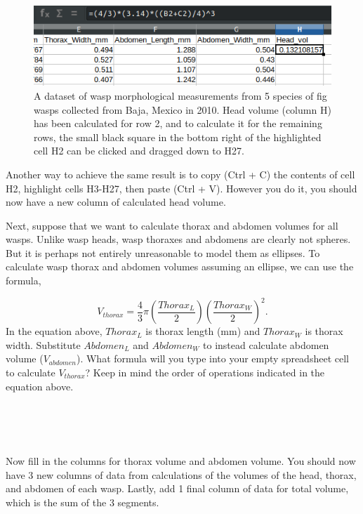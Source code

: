 \documentclass[
]{scrbook}
\begin{document}
\begin{figure}
\includegraphics[width=1\linewidth]{img/Ch1_Ex3_copy_formula} \caption{A dataset of wasp morphological measurements from 5 species of fig wasps collected from Baja, Mexico in 2010. Head volume (column H) has been calculated for row 2, and to calculate it for the remaining rows, the small black square in the bottom right of the highlighted cell H2 can be clicked and dragged down to H27.}\label{fig:unnamed-chunk-20}
\end{figure}

Another way to achieve the same result is to copy (Ctrl + C) the contents of cell H2, highlight cells H3-H27, then paste (Ctrl + V).
However you do it, you should now have a new column of calculated head volume.

Next, suppose that we want to calculate thorax and abdomen volumes for all wasps.
Unlike wasp heads, wasp thoraxes and abdomens are clearly not spheres.
But it is perhaps not entirely unreasonable to model them as ellipses.
To calculate wasp thorax and abdomen volumes assuming an ellipse, we can use the formula,

\[V_{thorax} = \frac{4}{3}\pi \left(\frac{Thorax_{L}}{2}\right)\left(\frac{Thorax_{W}}{2}\right)^{2}.\]
In the equation above, \(Thorax_{L}\) is thorax length (mm) and \(Thorax_{W}\) is thorax width.
Substitute \(Abdomen_{L}\) and \(Abdomen_{W}\) to instead calculate abdomen volume (\(V_{abdomen}\)).
What formula will you type into your empty spreadsheet cell to calculate \(V_{thorax}\)? Keep in mind the order of operations indicated in the equation above.

\begin{verbatim}




\end{verbatim}

Now fill in the columns for thorax volume and abdomen volume.
You should now have 3 new columns of data from calculations of the volumes of the head, thorax, and abdomen of each wasp.
Lastly, add 1 final column of data for total volume, which is the sum of the 3 segments.
\end{document}
